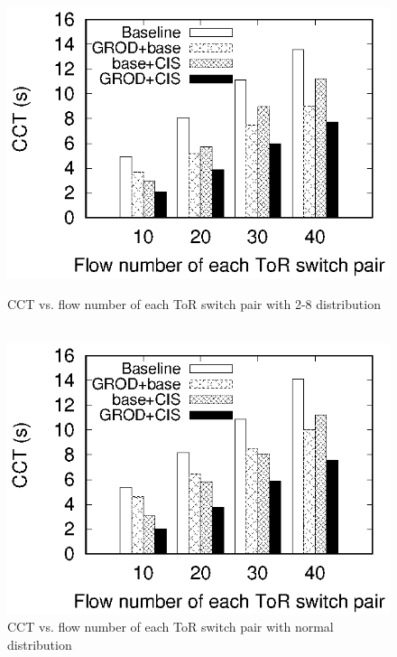 \begin{figure}
\begin{minipage}[c]{0.23\textwidth}
\includegraphics[width=1\textwidth]{28_flow_cct_histogram.eps}
\caption{CCT vs. flow number of each ToR switch pair with 2-8 distribution$\qquad$$\qquad$}\label{fig:28_flow_cct_histogram}
\end{minipage}
\hspace{1mm}
\begin{minipage}[c]{0.23\textwidth}
\centering

\includegraphics[width=1\textwidth]{normal_flow_cct_histogram.eps}
\caption{CCT vs. flow number of each ToR switch pair with normal distribution$\qquad$$\qquad$}\label{fig:normal_flow_cct_histogram}
\end{minipage}
\vspace{-0.5cm}

\end{figure}

